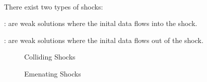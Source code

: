 \begin{defnbox}\nospacing
    \begin{defn}\label{defn:shock_types}\leavevmode\\
        There exist two types of shocks:
        \begin{circlelistnosep}
            \item {}: are weak solutions where the inital data flows into the shock.
            \item {}: are weak solutions where the inital data flows out of the shock.
        \end{circlelistnosep}
        \begin{minipage}[t]{0.49\textwidth}
            \vspace{-1em}
          \begin{figure}[H]
              \centering{
                \def\svgwidth{130pt}
                \resizebox{\linewidth}{!}{}
              }
              \vspace{-2em}
              \caption{\scriptsize Colliding Shocks}
          \end{figure}
        \end{minipage}
        \begin{minipage}[t]{0.49\textwidth}
            \vspace{-1em}
        \begin{figure}[H]
            \centering{
              \def\svgwidth{130pt}
              \resizebox{\linewidth}{!}{}
            }
            \vspace{-2em}
            \caption{\scriptsize Emenating Shocks}
        \end{figure}
        \end{minipage}
    \end{defn}
\end{defnbox}


